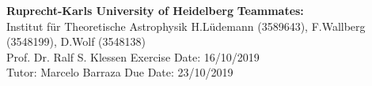 \documentclass[a4paper, 11pt]{article}
\begin{document}
\large\textbf{Ruprecht-Karls University of Heidelberg} \hfill \textbf{Teammates:} \\
\normalsize Institut für Theoretische Astrophysik \hfill 
H.Lüdemann (3589643), F.Wallberg (3548199), D.Wolf (3548138) \\
Prof. Dr. Ralf S. Klessen \hfill Exercise Date: 16/10/2019 \\
Tutor: Marcelo Barraza \hfill Due Date: 23/10/2019 \\




\end{document}
